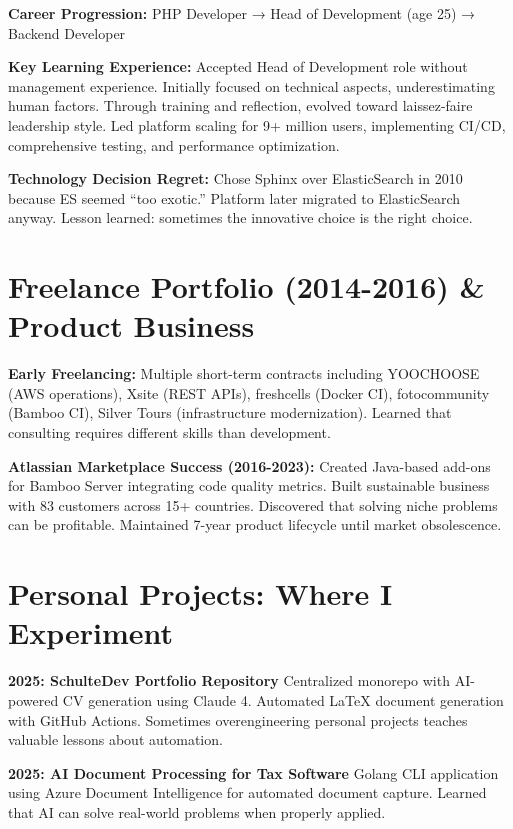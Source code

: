 \documentclass[11pt,a4paper]{article}
\begin{document}
\textbf{Career Progression:} PHP Developer → Head of Development (age 25) → Backend Developer

\textbf{Key Learning Experience:} Accepted Head of Development role without management experience. Initially focused on technical aspects, underestimating human factors. Through training and reflection, evolved toward laissez-faire leadership style. Led platform scaling for 9+ million users, implementing CI/CD, comprehensive testing, and performance optimization.

\textbf{Technology Decision Regret:} Chose Sphinx over ElasticSearch in 2010 because ES seemed ``too exotic.'' Platform later migrated to ElasticSearch anyway. Lesson learned: sometimes the innovative choice is the right choice.

\vspace{0.5em}

\section*{Freelance Portfolio (2014-2016) \& Product Business}

\textbf{Early Freelancing:} Multiple short-term contracts including YOOCHOOSE (AWS operations), Xsite (REST APIs), freshcells (Docker CI), fotocommunity (Bamboo CI), Silver Tours (infrastructure modernization). Learned that consulting requires different skills than development.

\textbf{Atlassian Marketplace Success (2016-2023):} Created Java-based add-ons for Bamboo Server integrating code quality metrics. Built sustainable business with 83 customers across 15+ countries. Discovered that solving niche problems can be profitable. Maintained 7-year product lifecycle until market obsolescence.

\vspace{0.5em}

\section*{Personal Projects: Where I Experiment}

\textbf{2025: SchulteDev Portfolio Repository}
Centralized monorepo with AI-powered CV generation using Claude 4. Automated LaTeX document generation with GitHub Actions. Sometimes overengineering personal projects teaches valuable lessons about automation.

\textbf{2025: AI Document Processing for Tax Software}
Golang CLI application using Azure Document Intelligence for automated document capture. Learned that AI can solve real-world problems when properly applied.
\end{document}
